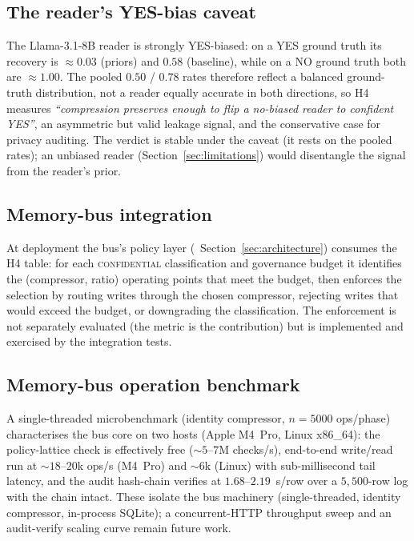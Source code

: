 \subsection{The reader's YES-bias caveat}
\label{sec:h4_bias}

The Llama-3.1-8B reader is strongly YES-biased: on a YES ground
truth its recovery is $\approx0.03$ (priors) and $0.58$ (baseline),
while on a NO ground truth both are $\approx1.00$. The pooled $0.50$
/ $0.78$ rates therefore reflect a balanced ground-truth
distribution, not a reader equally accurate in both directions, so
H4 measures \emph{``compression preserves enough to flip a no-biased
reader to confident YES''}, an asymmetric but valid leakage signal,
and the conservative case for privacy auditing. The verdict is stable
under the caveat (it rests on the pooled rates); an unbiased reader
(Section~\ref{sec:limitations}) would disentangle the signal from the
reader's prior.

\subsection{Memory-bus integration}
\label{sec:h4_membus}

At deployment the bus's policy layer
(~Section~\ref{sec:architecture}) consumes the
H4 table: for each \textsc{confidential} classification and
governance budget it identifies the (compressor, ratio) operating
points that meet the budget, then enforces the selection by routing
writes through the chosen compressor, rejecting writes that would
exceed the budget, or downgrading the classification. The enforcement
is not separately evaluated (the metric is the contribution) but is
implemented and exercised by the integration tests.

\subsection{Memory-bus operation benchmark}
\label{sec:bus_bench}

A single-threaded microbenchmark (identity compressor, $n=5000$
ops/phase) characterises the bus core on two hosts (Apple M4~Pro,
Linux x86\_64): the policy-lattice check is effectively free
($\sim5$--$7$M checks/s), end-to-end write/read run at
$\sim18$--$20$k ops/s (M4~Pro) and $\sim6$k (Linux) with
sub-millisecond tail latency, and the audit hash-chain verifies at
$1.68$--$2.19$~\textmu s/row over a $5{,}500$-row log with the chain
intact. These isolate the bus machinery (single-threaded, identity
compressor, in-process SQLite); a concurrent-HTTP throughput sweep
and an audit-verify scaling curve remain future work.


